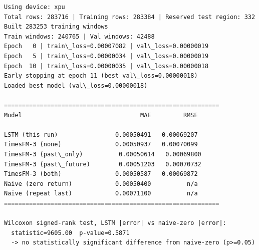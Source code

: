 \documentclass[11pt]{article}
\makeatletter
\newcommand{\boxspacing}{\kern\kvtcb@left@rule\kern\kvtcb@boxsep}
\newcommand{\prompt}[4]{
        {\ttfamily\llap{{\color{#2}[#3]:\hspace{3pt}#4}}\vspace{-\baselineskip}}
    }
\makeatother
\begin{document}
    \begin{Verbatim}[commandchars=\\\{\}]
Using device: xpu
Total rows: 283716 | Training rows: 283384 | Reserved test region: 332
Built 283253 training windows
Train windows: 240765 | Val windows: 42488
Epoch   0 | train\_loss=0.00007082 | val\_loss=0.00000019
Epoch   5 | train\_loss=0.00000034 | val\_loss=0.00000019
Epoch  10 | train\_loss=0.00000035 | val\_loss=0.00000018
Early stopping at epoch 11 (best val\_loss=0.00000018)
Loaded best model (val\_loss=0.00000018)

============================================================
Model                                 MAE         RMSE
------------------------------------------------------------
LSTM (this run)                0.00050491   0.00069207
TimesFM-3 (none)               0.00050937   0.00070099
TimesFM-3 (past\_only)          0.00050614   0.00069800
TimesFM-3 (past\_future)        0.00051203   0.00070732
TimesFM-3 (both)               0.00050587   0.00069872
Naive (zero return)            0.00050400          n/a
Naive (repeat last)            0.00071100          n/a
============================================================

Wilcoxon signed-rank test, LSTM |error| vs naive-zero |error|:
  statistic=9605.00  p-value=0.5871
  -> no statistically significant difference from naive-zero (p>=0.05)
    \end{Verbatim}

    \begin{tcolorbox}[breakable, size=fbox, boxrule=1pt, pad at break*=1mm,colback=cellbackground, colframe=cellborder]
\prompt{In}{incolor}{ }{\boxspacing}
\begin{Verbatim}[commandchars=\\\{\}]

\end{Verbatim}
\end{tcolorbox}


    
    
    
\end{document}

